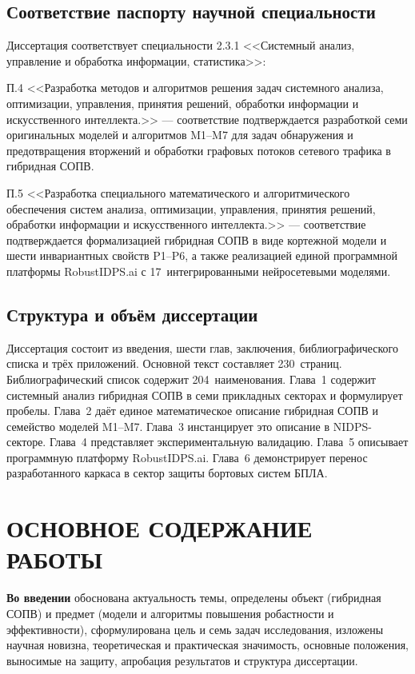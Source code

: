 \documentclass[12pt,a5paper]{article}
\begin{document}
\subsection*{Соответствие паспорту научной специальности}

Диссертация соответствует специальности 2.3.1 <<Системный
анализ, управление и обработка информации, статистика>>:

\noindent П.4 <<Разработка методов и алгоритмов решения задач
системного анализа, оптимизации, управления, принятия решений,
обработки информации и искусственного интеллекта.>> ---
соответствие подтверждается разработкой семи оригинальных
моделей и алгоритмов M1--M7 для задач обнаружения и
предотвращения вторжений и обработки графовых потоков сетевого
трафика в гибридная СОПВ.

\noindent П.5 <<Разработка специального математического и
алгоритмического обеспечения систем анализа, оптимизации,
управления, принятия решений, обработки информации и
искусственного интеллекта.>> --- соответствие подтверждается
формализацией гибридная СОПВ в виде кортежной модели и шести
инвариантных свойств P1--P6, а также реализацией единой
программной платформы RobustIDPS.ai с 17~интегрированными
нейросетевыми моделями.

\subsection*{Структура и объём диссертации}

Диссертация состоит из введения, шести глав, заключения,
библиографического списка и трёх приложений. Основной текст
составляет 230~страниц. Библиографический список содержит
204~наименования. Глава~1 содержит системный анализ гибридная СОПВ
в семи прикладных секторах и формулирует пробелы. Глава~2 даёт
единое математическое описание гибридная СОПВ и семейство моделей
M1--M7. Глава~3 инстанцирует это описание в NIDPS-секторе.
Глава~4 представляет экспериментальную валидацию. Глава~5
описывает программную платформу RobustIDPS.ai. Глава~6
демонстрирует перенос разработанного каркаса в сектор защиты
бортовых систем БПЛА.

\section*{ОСНОВНОЕ СОДЕРЖАНИЕ РАБОТЫ}

\textbf{Во введении} обоснована актуальность темы, определены
объект (гибридная СОПВ) и предмет (модели и алгоритмы повышения
робастности и эффективности), сформулирована цель и семь задач
исследования, изложены научная новизна, теоретическая и
практическая значимость, основные положения, выносимые на
защиту, апробация результатов и структура диссертации.
\end{document}
